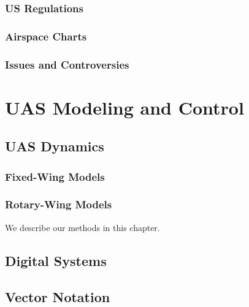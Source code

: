 \documentclass[
]{book}
\begin{document}
\hypertarget{us-regulations}{%
\section{US Regulations}\label{us-regulations}}

\hypertarget{airspace-charts}{%
\section{Airspace Charts}\label{airspace-charts}}

\hypertarget{issues-and-controversies}{%
\section{Issues and Controversies}\label{issues-and-controversies}}

\hypertarget{part-uas-modeling-and-control}{%
\part{UAS Modeling and Control}\label{part-uas-modeling-and-control}}

\hypertarget{uas-dynamics}{%
\chapter{UAS Dynamics}\label{uas-dynamics}}

\hypertarget{fixed-wing-models}{%
\section{Fixed-Wing Models}\label{fixed-wing-models}}

\hypertarget{rotary-wing-models}{%
\section{Rotary-Wing Models}\label{rotary-wing-models}}

We describe our methods in this chapter.

\hypertarget{refs}{}

\hypertarget{appendix-appendix}{%
\appendix}


\hypertarget{digital-systems}{%
\chapter{Digital Systems}\label{digital-systems}}

\hypertarget{vector-notation}{%
\chapter{Vector Notation}\label{vector-notation}}

  
\end{document}
